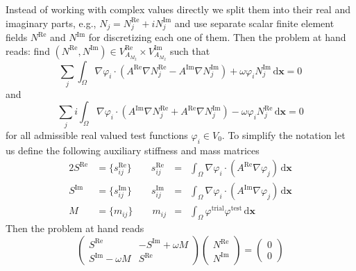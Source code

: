 \documentclass[11pt,a4paper]{article}
\begin{document}
Instead of working with complex values directly we split them into their real and imaginary parts, e.g., $N_j=N_j^\textrm{Re}+iN_j^\textrm{Im}$ and use separate scalar finite element fields $N^\textrm{Re}$ and $N^\textrm{Im}$ for discretizing each one of them. Then the problem at hand reads: find $(N^\textrm{Re},N^\textrm{Im})\in V_{A_{M_2}}^\textrm{Re}\times V_{A_{M_2}}^\textrm{Im}$ such that
\begin{equation}
\sum_j\int_\Omega \nabla\varphi_i\cdot\left(A^\textrm{Re}\nabla N_j^\textrm{Re}-A^\textrm{Im}\nabla N_j^\textrm{Im}\right)+\omega \varphi_i N_j^\textrm{Im}\,\mathrm{d}\mathbf{x}=0
\end{equation}
and
\begin{equation}
\sum_ji\int_\Omega \nabla\varphi_i\cdot\left(A^\textrm{Im}\nabla N_j^\textrm{Re}+A^\textrm{Re}\nabla N_j^\textrm{Im}\right)-\omega \varphi_i N_j^\textrm{Re}\,\mathrm{d}\mathbf{x}=0
\end{equation}
for all admissible real valued test functions $\varphi_i\in V_{0}$.
To simplify the notation let us define the following auxiliary stiffness and mass matrices
\begin{alignat}{2}
S^\textrm{Re}&=\{s_{ij}^\textrm{Re}\} \qquad s_{ij}^\textrm{Re}&=&\int_\Omega \nabla\varphi_i\cdot(A^\textrm{Re}\nabla\varphi_j)\,\mathrm{d}\mathbf{x}\\
S^\textrm{Im}&=\{s_{ij}^\textrm{Im}\} \qquad s_{ij}^\textrm{Im}&=&\int_\Omega \nabla\varphi_i\cdot(A^\textrm{Im}\nabla\varphi_j)\,\mathrm{d}\mathbf{x}\\
M&=\{m_{ij}\} \qquad m_{ij}&=&\int_\Omega \varphi^\text{trial}\varphi^\text{test}\,\mathrm{d}\mathbf{x}
\end{alignat}
Then the problem at hand reads
\begin{equation}
\begin{pmatrix}
S^\textrm{Re} & -S^\textrm{Im}+\omega M\\
S^\textrm{Im}-\omega M &  S^\textrm{Re}
\end{pmatrix}
\begin{pmatrix}
N^\textrm{Re}\\
N^\textrm{Im}
\end{pmatrix}
=
\begin{pmatrix}
0\\
0
\end{pmatrix}
\end{equation}
\end{document}
